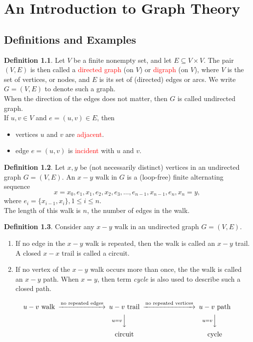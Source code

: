 \documentclass[letter]{book}
\theoremstyle{definition}
\theoremstyle{definition}
\newtheorem{mydef}{Definition}[chapter]
\theoremstyle{remark}
\begin{document}
\setcounter{chapter}{10}
\chapter{An Introduction to Graph Theory}
\section{Definitions and Examples}
\begin{mydef}
    Let $V$ be a finite nonempty set, and let $E\subseteq V\times V$. The pair $(V,E)$ is then called a \textcolor{red}{directed graph} (on $V$) or \textcolor{red}{digraph} (on $V$), where $V$ is the set of vertices, or nodes, and $E$ is its set of (directed) edges or arcs. We write $G=(V,E)$ to denote such a graph. \\
    When the direction of the edges does not matter, then $G$ is called undirected graph.\\
    If $u,v\in V$ and $e=(u,v)\in E$, then
    \begin{itemize}
        \item vertices $u$ and $v$ are \textcolor{red}{adjacent}.
        \item edge $e=(u,v)$ is \textcolor{red}{incident} with $u$ and $v$.
    \end{itemize}
\end{mydef}
\bigskip 
\begin{mydef}
    Let $x,y$ be (not necessarily distinct) vertices in an undirected graph $G=(V,E)$. An $x-y$ walk in $G$ is a (loop-free) finite alternating sequence
        \begin{equation*}
        x=x_0,e_1,x_1,e_2,x_2,e_3,\ldots,e_{n-1},x_{n-1},e_n,x_n=y,
        \end{equation*}
    where $e_i=\{x_{i-1},x_i\},1\leq i\leq n$.\\
    The length of this walk is $n$, the number of edges in the walk.
\end{mydef}
\bigskip 
\begin{mydef}
    Consider any $x-y$ walk in an undirected graph $G=(V,E)$.
    \begin{enumerate}[label=\alph*)]
        \item If no edge in the $x-y$ walk is repeated, then the walk is called an $x-y$ trail. A closed $x-x$ trail is called a circuit.
        \item If no vertex of the $x-y$ walk occurs more than once, the the walk is called an $x-y$ path. When $x=y$, then term \textit{cycle} is also used to describe such a closed path.
    \end{enumerate}
\end{mydef}
\begin{equation*}
    \begin{CD}
    u-v\text{ walk} @>\text{no repeated edges}>> u-v\text{ trail} @>{\text{no repeated vertices}}>> u-v\text{ path} \\
    @. @Vu=vVV @Vu=vVV \\
    @. \text{circuit} @. \text{cycle}
    \end{CD}
\end{equation*}
\end{document}
